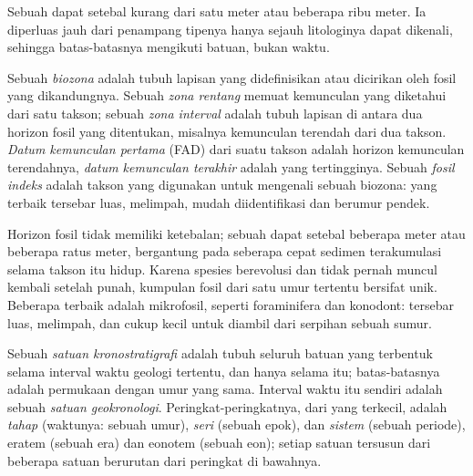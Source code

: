 Sebuah  dapat setebal kurang dari satu meter atau beberapa ribu meter. Ia diperluas jauh dari penampang tipenya hanya sejauh litologinya dapat dikenali, sehingga batas-batasnya mengikuti batuan, bukan waktu.

\begin{definition}\label{def:b1:stratigraphic-scale:biozone}
Sebuah \emph{biozona} adalah tubuh lapisan yang didefinisikan atau dicirikan oleh fosil yang dikandungnya. Sebuah \emph{zona rentang} memuat kemunculan yang diketahui dari satu takson; sebuah \emph{zona interval} adalah tubuh lapisan di antara dua horizon fosil yang ditentukan, misalnya kemunculan terendah dari dua takson. \emph{Datum kemunculan pertama} (FAD) dari suatu takson adalah horizon kemunculan terendahnya, \emph{datum kemunculan terakhir} adalah yang tertingginya. Sebuah \emph{fosil indeks} adalah takson yang digunakan untuk mengenali sebuah biozona: yang terbaik tersebar luas, melimpah, mudah diidentifikasi dan berumur pendek.
\end{definition}

Horizon fosil tidak memiliki ketebalan; sebuah  dapat setebal beberapa meter atau beberapa ratus meter, bergantung pada seberapa cepat sedimen terakumulasi selama takson itu hidup. Karena spesies berevolusi dan tidak pernah muncul kembali setelah punah, kumpulan fosil dari satu umur tertentu bersifat unik. Beberapa  terbaik adalah mikrofosil, seperti foraminifera dan konodont: tersebar luas, melimpah, dan cukup kecil untuk diambil dari serpihan sebuah sumur.

\begin{definition}\label{def:b1:stratigraphic-scale:chronostratigraphy}
Sebuah \emph{satuan kronostratigrafi} adalah tubuh seluruh batuan yang terbentuk selama interval waktu geologi tertentu, dan hanya selama itu; batas-batasnya adalah permukaan dengan umur yang sama. Interval waktu itu sendiri adalah sebuah \emph{satuan geokronologi}. Peringkat-peringkatnya, dari yang terkecil, adalah \emph{tahap} (waktunya: sebuah umur), \emph{seri} (sebuah epok), dan
\emph{sistem} (sebuah periode), eratem (sebuah era) dan eonotem (sebuah eon); setiap satuan tersusun dari beberapa satuan berurutan dari peringkat di bawahnya.
\end{definition}

